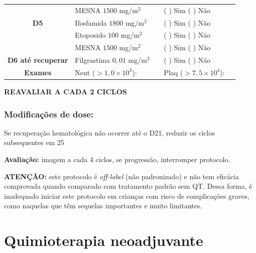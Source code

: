 \documentclass[11pt,a4paper,oldfontcommands]{memoir}
\begin{document}
\begin{center}
\begin{table}[H]
\begin{tabular}{c|p{4cm}|p{1.3cm}|p{3cm}|p{2.7cm}}
    \multicolumn{1}{c|}{\multirow{1}{*}{\textbf{}}}&{MESNA \(1500\) mg/m\(^2\)}&&{(  ) Sim (  ) Não}&\\
    \multicolumn{1}{c|}{\multirow{1}{*}{\textbf{D5}}}&{Ifosfamida \(1800\) mg/m\(^2\)}&&{(  ) Sim (  ) Não}&\\
    \multicolumn{1}{c|}{\multirow{1}{*}{\textbf{}}}&{Etoposido \(100\) mg/m\(^2\)}&&{(  ) Sim (  ) Não}&\\
    \multicolumn{1}{c|}{\multirow{1}{*}{\textbf{}}}&{MESNA \(1500\) mg/m\(^2\)}&&{(  ) Sim (  ) Não}&\\
    \multicolumn{1}{c|}{\multirow{1}{*}{\textbf{D6 até recuperar}}}&{Filgrastima \(0,01\) mg/m\(^2\)}&&{(  ) Sim (  ) Não}&\\

    \hline
    \multicolumn{1}{c|}{\multirow{1}{*}{\textbf{Exames}}}&\multicolumn{2}{l|}{Neut (\(>1,0\times10^3\)):}&{Plaq (\(>7,5\times10^4\)):}&{}\\
    \hline
\end{tabular}
\end{table}
\textbf{REAVALIAR A CADA 2 CICLOS}
\end{center}


\subsection{Modificações de dose:}
Se recuperação hematológica nâo ocorrer até o D21, reduzir os ciclos subsequentes em 25%

\textbf{Avaliação:} imagem a cada 4 ciclos, se progressão, interromper protocolo.

\textbf{ATENÇÃO:} este protocolo é \textit{off-label} (não padronizado) e não tem eficácia comprovada quando comparado com tratamento padrão sem QT. Dessa forma, é inadequado iniciar este protocolo em crianças com risco de complicações graves, como naquelas que têm sequelas importantes e muito limitantes.

\cleardoublepage
\chapter{Quimioterapia neoadjuvante}
\cleardoublepage
\end{document}
